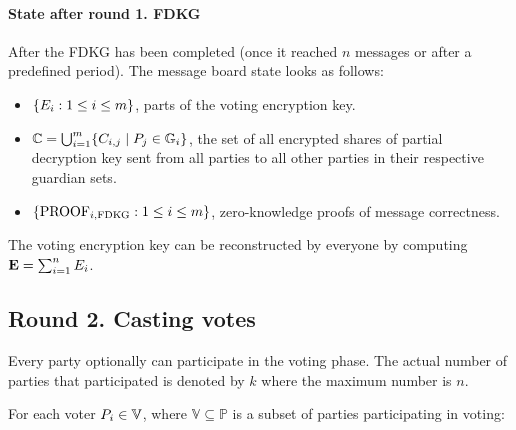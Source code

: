 \documentclass{article}
\begin{document}
\paragraph*{State after round 1. FDKG}

After the FDKG has been completed (once it reached $n$ messages or after a predefined period). The message board state looks as follows:
\begin{itemize}
    \item $\{E_{i} : 1 \leq i \leq m\}$, parts of the voting encryption key.
    \item $\mathbb{C} = \bigcup_{i=1}^{m} \{C_{i,j} \mid P_j \in \mathbb{G}_i\}$, the set of all encrypted shares of partial decryption key sent from all parties to all other parties in their respective guardian sets.
    \item $\{\textrm{PROOF}_{i,\textrm{FDKG}} : 1 \leq i \leq m\}$, zero-knowledge proofs of message correctness.
\end{itemize}



The voting encryption key \EncryptionKey{} can be reconstructed by everyone by computing $\textbf{E}=\sum_{i=1}^{n} E_{i}$.


\subsection{Round 2. Casting votes}

Every party optionally can participate in the voting phase. The actual number of parties that participated is denoted by $k$ where the maximum number is $n$.

For each voter $P_{i} \in \mathbb{V}$, where $\mathbb{V} \subseteq  \mathbb{P}$ is a subset of parties participating in voting:
\end{document}
